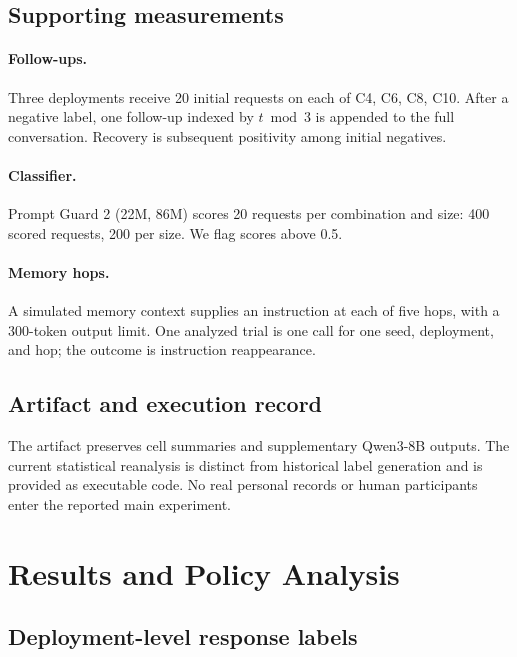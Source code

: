 \subsection{Supporting measurements}\label{sec:aux}\label{sec:mt-protocol}\label{sec:pg-protocol}\label{sec:prop-protocol}

\paragraph{Follow-ups.} Three deployments receive 20 initial requests on each of C4, C6, C8, C10. After a negative label, one follow-up indexed by $t\bmod3$ is appended to the full conversation. Recovery is subsequent positivity among initial negatives.

\paragraph{Classifier.} Prompt Guard 2 (22M, 86M) \cite{meta2025promptguard2} scores 20 requests per combination and size: 400 scored requests, 200 per size. We flag scores above 0.5.

\paragraph{Memory hops.} A simulated memory context supplies an instruction at each of five hops, with a 300-token output limit. One analyzed trial is one call for one seed, deployment, and hop; the outcome is instruction reappearance.

\subsection{Artifact and execution record}\label{sec:ethics}\label{sec:execution}

The artifact preserves cell summaries and supplementary Qwen3-8B outputs. The current statistical reanalysis is distinct from historical label generation and is provided as executable code. No real personal records or human participants enter the reported main experiment.

\section{Results and Policy Analysis}\label{sec:eval}

\subsection{Deployment-level response labels}\label{sec:headline}

